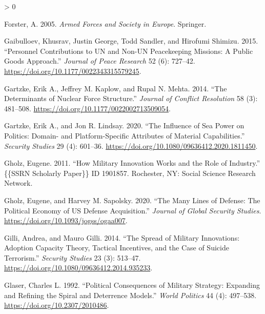\documentclass[
]{article}
\newlength{\cslhangindent}
\newenvironment{CSLReferences}[2] %
 {%
  \setlength{\parindent}{0pt}
  \ifodd #1 \everypar{\setlength{\hangindent}{\cslhangindent}}\ignorespaces\fi
  \ifnum #2 > 0
  \setlength{\parskip}{#2\baselineskip}
  \fi
 }%
 {}
\begin{document}
\begin{CSLReferences}{1}{0}
\leavevmode\hypertarget{ref-forster_armedforcessociety_2005}{}%
Forster, A. 2005. \emph{Armed {Forces} and {Society} in {Europe}}. {Springer}.

\leavevmode\hypertarget{ref-gaibulloev_personnelcontributionsnonun_2015}{}%
Gaibulloev, Khusrav, Justin George, Todd Sandler, and Hirofumi Shimizu. 2015. {``Personnel Contributions to {UN} and Non-{UN} Peacekeeping Missions: {A} Public Goods Approach.''} \emph{Journal of Peace Research} 52 (6): 727--42. \url{https://doi.org/10.1177/0022343315579245}.

\leavevmode\hypertarget{ref-gartzke_determinantsnuclearforce_2014}{}%
Gartzke, Erik A., Jeffrey M. Kaplow, and Rupal N. Mehta. 2014. {``The {Determinants} of {Nuclear Force Structure}.''} \emph{Journal of Conflict Resolution} 58 (3): 481--508. \url{https://doi.org/10.1177/0022002713509054}.

\leavevmode\hypertarget{ref-gartzke_influenceseapower_2020}{}%
Gartzke, Erik A., and Jon R. Lindsay. 2020. {``The {Influence} of {Sea Power} on {Politics}: {Domain}- and {Platform}-{Specific Attributes} of {Material Capabilities}.''} \emph{Security Studies} 29 (4): 601--36. \url{https://doi.org/10.1080/09636412.2020.1811450}.

\leavevmode\hypertarget{ref-gholz_howmilitaryinnovation_2011}{}%
Gholz, Eugene. 2011. {``How {Military Innovation Works} and the {Role} of {Industry}.''} \{\{SSRN Scholarly Paper\}\} ID 1901857. {Rochester, NY}: {Social Science Research Network}.

\leavevmode\hypertarget{ref-gholz_manylinesdefense_2020}{}%
Gholz, Eugene, and Harvey M. Sapolsky. 2020. {``The {Many Lines} of {Defense}: {The Political Economy} of {US Defense Acquisition}.''} \emph{Journal of Global Security Studies}. \url{https://doi.org/10.1093/jogss/ogaa007}.

\leavevmode\hypertarget{ref-gilli_spreadmilitaryinnovations_2014}{}%
Gilli, Andrea, and Mauro Gilli. 2014. {``The {Spread} of {Military Innovations}: {Adoption Capacity Theory}, {Tactical Incentives}, and the {Case} of {Suicide Terrorism}.''} \emph{Security Studies} 23 (3): 513--47. \url{https://doi.org/10.1080/09636412.2014.935233}.

\leavevmode\hypertarget{ref-glaser_politicalconsequencesmilitary_1992}{}%
Glaser, Charles L. 1992. {``Political {Consequences} of {Military Strategy}: {Expanding} and {Refining} the {Spiral} and {Deterrence Models}.''} \emph{World Politics} 44 (4): 497--538. \url{https://doi.org/10.2307/2010486}.


\end{CSLReferences}
\end{document}
